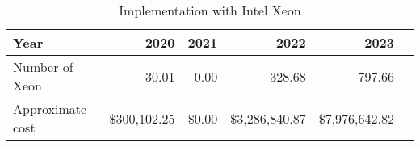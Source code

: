 \tiny \begin{longtable} { |p{}  |r  |r  |r  |r  |r |} 
\caption{Implementation with Intel Xeon \label{tab:Xeon}}\\ 
\hline 
\textbf{Year}&\textbf{2020}&\textbf{2021}&\textbf{2022}&\textbf{2023} \\ \hline
{Number of Xeon}&{30.01}&{0.00}&{328.68}&{797.66} \\ \hline
{Approximate cost}&{\$300,102.25}&{\$0.00}&{\$3,286,840.87}&{\$7,976,642.82} \\ \hline
\end{longtable} \normalsize
